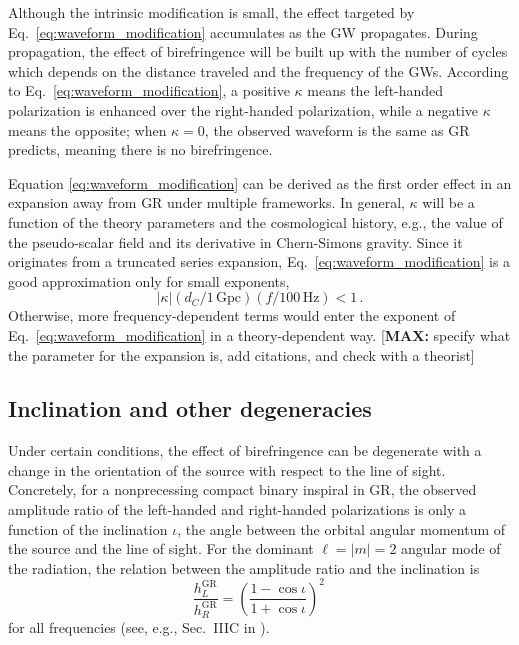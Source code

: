 \documentclass[aps,prd,twocolumn,superscriptaddress,preprintnumbers,floatfix,nofootinbib]{revtex4-2}
\newcommand*{\mi}[1]{\textsf{\color{magenta} [\textbf{MAX:} #1]}}
\begin{document}
Although the intrinsic modification is small, the effect targeted by Eq.~\eqref{eq:waveform_modification} accumulates as the \ac{GW} propagates.
During propagation, the effect of birefringence will be built up with the number of cycles which depends on the distance traveled and the frequency of the \acp{GW}.
According to Eq.~\eqref{eq:waveform_modification}, a positive $\kappa$ means the left-handed polarization is enhanced over the right-handed polarization, while a negative $\kappa$ means the opposite;
when $\kappa=0$, the observed waveform is the same as \ac{GR} predicts, meaning there is no birefringence.

Equation \eqref{eq:waveform_modification} can be derived as the first order effect in an expansion away from \ac{GR} under multiple frameworks.
In general, $\kappa$ will be a function of the theory parameters and the cosmological history, e.g., the value of the pseudo-scalar field and its derivative in Chern-Simons gravity.
Since it originates from a truncated series expansion, Eq.~\eqref{eq:waveform_modification} is a good approximation only for small exponents, 
\begin{equation}
\left|\kappa\right| \left(d_C/1\,\mathrm{Gpc}\right) \left(f/100\, \mathrm{Hz}\right) < 1\, .
\end{equation}
Otherwise, more frequency-dependent terms would enter the exponent of Eq.~\eqref{eq:waveform_modification} in a theory-dependent way.
\mi{specify what the parameter for the expansion is, add citations, and check with a theorist}

\subsection{Inclination and other degeneracies}
\label{sec:inclination}

Under certain conditions, the effect of birefringence can be degenerate with a change in the orientation of the source with respect to the line of sight.
Concretely, for a nonprecessing compact binary inspiral in \ac{GR}, the observed amplitude ratio of the left-handed and right-handed polarizations is only a function of the inclination $\iota$, the angle between the orbital angular momentum of the source and the line of sight.
For  the dominant $\ell = |m| = 2$ angular mode of the radiation, the relation between the amplitude ratio and the inclination is
\begin{equation}
    \frac{h_{L}^\mathrm{GR}}{h^\mathrm{GR}_{R}}=\left(\frac{1-\cos\iota}{1+\cos\iota}\right)^2\,
\end{equation}
for all frequencies (see, e.g., Sec.~IIIC in \cite{Isi:2022mbx}).
\end{document}
